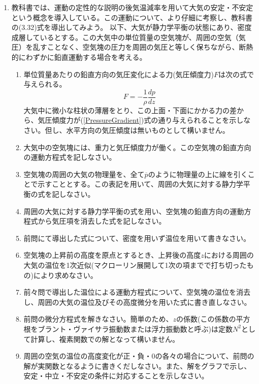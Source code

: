 \documentclass{jsarticle}
\newenvironment{problems}
{
  \renewcommand\labelenumi{\doublebox{\arabic{enumi}}}
  \begin{enumerate}
}{
  \end{enumerate}
  \renewcommand\labelenumi{\arabic{enumi}.}
}
\begin{document}
\begin{problems}
    \item 教科書では、運動の定性的な説明の後気温減率を用いて大気の安定・不安定という概念を導入している。この運動について、より仔細に考察し、教科書の(3.32)式を導出してみよう。
        以下、大気が静力学平衡の状態にあり、密度成層しているとする。この大気中の単位質量の空気塊が、周囲の空気（気圧）を乱すことなく、空気塊の圧力を周囲の気圧と等しく保ちながら、断熱的にわずかに鉛直運動する場合を考える。
        \begin{enumerate}[(1)]
        \item 単位質量あたりの鉛直方向の気圧変化による力(気圧傾度力)$F$は次の式で与えられる。
        \begin{equation}
            F=-\frac{1}{\rho}\frac{dp}{dz} \label{PressureGradient}
        \end{equation}
        大気中に微小な柱状の薄層をとり、この上面・下面にかかる力の差から、気圧傾度力が(\ref{PressureGradient})式の通り与えられることを示しなさい。但し、水平方向の気圧傾度は無いものとして構いません。
        \item 大気中の空気塊には、重力と気圧傾度力が働く。この空気塊の鉛直方向の運動方程式を記しなさい。
        \item 空気塊の周囲の大気の物理量を、全て$\overline{p}$のように物理量の上に線を引くことで示すこととする。この表記を用いて、周囲の大気に対する静力学平衡の式を記しなさい。
        \item 周囲の大気に対する静力学平衡の式を用い、空気塊の鉛直方向の運動方程式から気圧項を消去した式を記しなさい。
        \item 前問にて導出した式について、密度を用いず温位を用いて書きなさい。
        \item 空気塊の上昇前の高度を原点とするとき、上昇後の高度$z$における周囲の大気の温位を1次近似(マクローリン展開して1次の項までで打ち切ったもの)により求めなさい。
        \item 前々問で導出した温位による運動方程式について、空気塊の温位を消去し、周囲の大気の温位及びその高度微分を用いた式に書き直しなさい。
        \item 前問の微分方程式を解きなさい。簡単のため、$z$の係数(この係数の平方根をブラント・ヴァイサラ振動数または浮力振動数と呼ぶ)は定数$N^2$として計算し、複素関数での解となって構いません。
        \item 周囲の空気の温位の高度変化が正・負・0の各々の場合について、前問の解が実関数となるように書きくだしなさい。また、解をグラフで示し、安定・中立・不安定の条件に対応することを示しなさい。
        \end{enumerate}

\end{problems}
\end{document}
